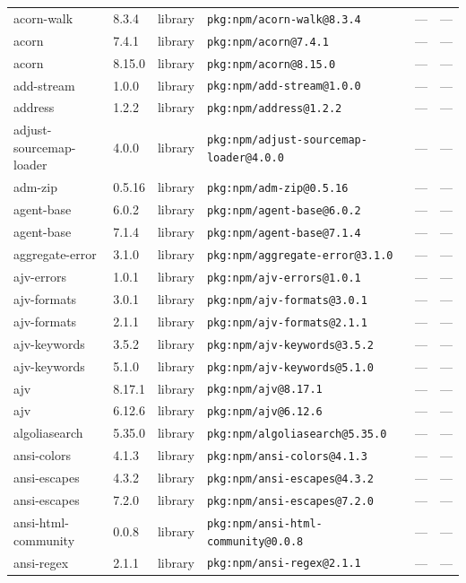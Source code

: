 \documentclass[11pt]{article}
\begin{document}
\begin{longtable}{|l|l|l|p{2.2cm}|l|p{4cm}|}
acorn-walk & 8.3.4 & library & \texttt{pkg:npm/acorn-walk@8.3.4} & — & — \\
acorn & 7.4.1 & library & \texttt{pkg:npm/acorn@7.4.1} & — & — \\
acorn & 8.15.0 & library & \texttt{pkg:npm/acorn@8.15.0} & — & — \\
add-stream & 1.0.0 & library & \texttt{pkg:npm/add-stream@1.0.0} & — & — \\
address & 1.2.2 & library & \texttt{pkg:npm/address@1.2.2} & — & — \\
adjust-sourcemap-loader & 4.0.0 & library & \texttt{pkg:npm/adjust-sourcemap-loader@4.0.0} & — & — \\
adm-zip & 0.5.16 & library & \texttt{pkg:npm/adm-zip@0.5.16} & — & — \\
agent-base & 6.0.2 & library & \texttt{pkg:npm/agent-base@6.0.2} & — & — \\
agent-base & 7.1.4 & library & \texttt{pkg:npm/agent-base@7.1.4} & — & — \\
aggregate-error & 3.1.0 & library & \texttt{pkg:npm/aggregate-error@3.1.0} & — & — \\
ajv-errors & 1.0.1 & library & \texttt{pkg:npm/ajv-errors@1.0.1} & — & — \\
ajv-formats & 3.0.1 & library & \texttt{pkg:npm/ajv-formats@3.0.1} & — & — \\
ajv-formats & 2.1.1 & library & \texttt{pkg:npm/ajv-formats@2.1.1} & — & — \\
ajv-keywords & 3.5.2 & library & \texttt{pkg:npm/ajv-keywords@3.5.2} & — & — \\
ajv-keywords & 5.1.0 & library & \texttt{pkg:npm/ajv-keywords@5.1.0} & — & — \\
ajv & 8.17.1 & library & \texttt{pkg:npm/ajv@8.17.1} & — & — \\
ajv & 6.12.6 & library & \texttt{pkg:npm/ajv@6.12.6} & — & — \\
algoliasearch & 5.35.0 & library & \texttt{pkg:npm/algoliasearch@5.35.0} & — & — \\
ansi-colors & 4.1.3 & library & \texttt{pkg:npm/ansi-colors@4.1.3} & — & — \\
ansi-escapes & 4.3.2 & library & \texttt{pkg:npm/ansi-escapes@4.3.2} & — & — \\
ansi-escapes & 7.2.0 & library & \texttt{pkg:npm/ansi-escapes@7.2.0} & — & — \\
ansi-html-community & 0.0.8 & library & \texttt{pkg:npm/ansi-html-community@0.0.8} & — & — \\
ansi-regex & 2.1.1 & library & \texttt{pkg:npm/ansi-regex@2.1.1} & — & — \\

\end{longtable}
\end{document}
